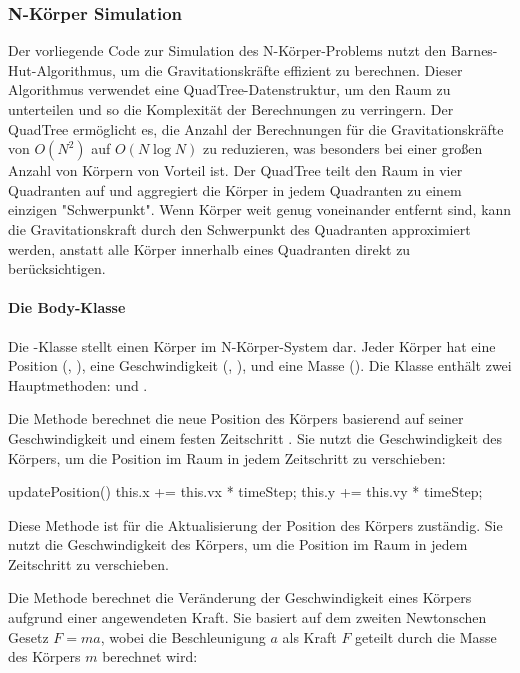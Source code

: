 \documentclass[a4paper,12pt,twoside]{article}
\begin{document}
\subsubsection{N-Körper Simulation}

Der vorliegende Code zur Simulation des N-Körper-Problems nutzt den Barnes-Hut-Algorithmus, um die Gravitationskräfte effizient zu berechnen. Dieser Algorithmus verwendet eine QuadTree-Datenstruktur, um den Raum zu unterteilen und so die Komplexität der Berechnungen zu verringern. Der QuadTree ermöglicht es, die Anzahl der Berechnungen für die Gravitationskräfte von \(O(N^2)\) auf \(O(N \log N)\) zu reduzieren, was besonders bei einer großen Anzahl von Körpern von Vorteil ist. Der QuadTree teilt den Raum in vier Quadranten auf und aggregiert die Körper in jedem Quadranten zu einem einzigen "Schwerpunkt". Wenn Körper weit genug voneinander entfernt sind, kann die Gravitationskraft durch den Schwerpunkt des Quadranten approximiert werden, anstatt alle Körper innerhalb eines Quadranten direkt zu berücksichtigen.

\paragraph{Die Body-Klasse}
Die -Klasse stellt einen Körper im N-Körper-System dar. Jeder Körper hat eine Position (, ), eine Geschwindigkeit (, ), und eine Masse (). Die Klasse enthält zwei Hauptmethoden:  und .

Die Methode  berechnet die neue Position des Körpers basierend auf seiner Geschwindigkeit und einem festen Zeitschritt . Sie nutzt die Geschwindigkeit des Körpers, um die Position im Raum in jedem Zeitschritt zu verschieben:

\begin{javascript}
updatePosition() {
    this.x += this.vx * timeStep;
    this.y += this.vy * timeStep;
}
\end{javascript}

Diese Methode ist für die Aktualisierung der Position des Körpers zuständig. Sie nutzt die Geschwindigkeit des Körpers, um die Position im Raum in jedem Zeitschritt zu verschieben.

Die Methode  berechnet die Veränderung der Geschwindigkeit eines Körpers aufgrund einer angewendeten Kraft. Sie basiert auf dem zweiten Newtonschen Gesetz \(F = ma\), wobei die Beschleunigung \(a\) als Kraft \(F\) geteilt durch die Masse des Körpers \(m\) berechnet wird:
\end{document}
